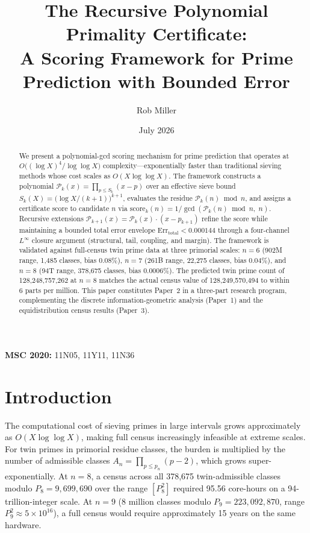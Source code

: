 \documentclass[11pt]{article}
\title{The Recursive Polynomial Primality Certificate: \\ A Scoring Framework for Prime Prediction with Bounded Error}
\author{Rob Miller}
\date{July 2026}
\begin{document}
\maketitle

\begin{abstract}
We present a polynomial-gcd scoring mechanism for prime prediction that operates
at $O\!\bigl((\log X)^4/\log\log X\bigr)$ complexity---exponentially faster than
traditional sieving methods whose cost scales as $O(X\log\log X)$. The framework
constructs a polynomial $\mathcal{P}_k(x) = \prod_{p\le S_k}(x-p)$ over an effective
sieve bound $S_k(X) = \bigl(\log X/(k+1)\bigr)^{k+1}$, evaluates the residue
$\mathcal{P}_k(n)\bmod n$, and assigns a certificate score to candidate $n$ via
$\text{score}_k(n) = 1/\gcd(\mathcal{P}_k(n)\bmod n,\; n)$. Recursive extensions
$\mathcal{P}_{k+1}(x)=\mathcal{P}_k(x)\cdot(x-p_{k+1})$ refine the score while
maintaining a bounded total error envelope
$\text{Err}_\mathrm{total} < 0.000144$ through a four-channel $L^\infty$ closure
argument (structural, tail, coupling, and margin). The framework is validated
against full-census twin prime data at three primorial scales: $n=6$ (902M range,
1{,}485 classes, bias 0.08\%), $n=7$ (261B range, 22{,}275 classes, bias 0.04\%),
and $n=8$ (94T range, 378{,}675 classes, bias 0.0006\%). The predicted twin prime
count of 128{,}248{,}757{,}262 at $n=8$ matches the actual census value of
128{,}249{,}570{,}494 to within 6 parts per million. This paper constitutes
Paper~2 in a three-part research program, complementing the discrete
information-geometric analysis (Paper~1) and the equidistribution census results
(Paper~3).
\end{abstract}

\noindent \textbf{MSC 2020:} 11N05, 11Y11, 11N36

\section{Introduction}

The computational cost of sieving primes in large intervals grows approximately
as $O(X\log\log X)$, making full census increasingly infeasible at extreme scales.
For twin primes in primorial residue classes, the burden is multiplied by the number
of admissible classes $A_n = \prod_{p\le p_n}(p-2)$, which grows super-exponentially.
At $n=8$, a census across all 378{,}675 twin-admissible classes modulo
$P_8 = 9{,}699{,}690$ over the range $[P_8^{\!2}]$ required 95.56 core-hours on a
94-trillion-integer scale. At $n=9$ (8 million classes modulo
$P_9 = 223{,}092{,}870$, range $P_9^{\!2} \approx 5\times 10^{16}$), a full census
would require approximately 15 years on the same hardware.
\end{document}
